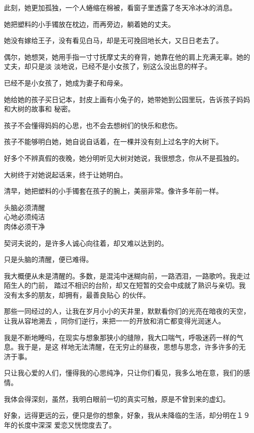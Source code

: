 \documentclass[12pt,a4paper]{article}
\begin{document}
		此刻，她更加孤独，一个人蜷缩在棉被，看窗子里透露了冬天冷冰冰的消息。

		她把塑料的小手镯放在枕边，而再旁边，躺着她的丈夫。

		她没有嫁给王子，没有看见白马，却是无可挽回地长大，又日日老去了。

		偶尔，她想哭，她用手指一寸寸抚摩丈夫的脊背，她靠在他的肩上充满无辜。她的丈夫，却只是淡
	淡地说，已经不是小女孩了，别这么没出息的样子。

		已经不是小女孩了，她成为妻子和母亲。

		她给她的孩子买日记本，封皮上画有小兔子的，她带她到公园里玩，告诉孩子妈妈和大树的故事和
	秘密。

		孩子不会懂得妈妈的心思，也不会去想树们的快乐和悲伤。

		孩子不能够明白她，她自说自话着，在一棵并没有刻上过名字的大树下。


		好多个不辨真假的夜晚，她分明听见大树对她说，我很想念，你从不是孤独的。

		大树终于对她说起话来，终于让她明白。


		清早，她把塑料的小手镯套在孩子的腕上，美丽非常。像许多年前一样。

	\endwriting



		\longpoem{}{}{}
		头脑必须清醒 \\
		心地必须纯洁 \\
		肉体必须干净
		\endlongpoem

		契诃夫说的，是许多人诚心向往着，却又难以达到的。\par
		只是头脑的清醒，便已难得。

		我大概便从未是清醒的。多数，是混沌中迷糊向前，一路洒泪，一路歌吟。我走过陌生人的门前，
	踏过不相识的台阶，却又在短暂的交会中成就了熟识与亲切。我没有太多的朋友，却拥有，最善良贴心
	的伙伴。

		那些一同经过的人，让我在岁月小小的天井里，默默看你们的光亮在暗夜的天空，让我从容地溯去
	，同你们逆行，来把一一的开放和消亡都变得光润迷人。

		我是不断地睡吗，在现实与想象那狭小的缝隙，我大口喘气，呼吸迷药一样的气息。我于是，是这
	样地无法清醒，在无穷止的昼夜，思想与思念，许多许多的无济于事。

		只让我心爱的人们，懂得我的心思纯净，只让你们看见，我多么地在意，我们的感情。

		我体会得深刻，虽然，我明白眼前一切的真实可触，原是不曾到来的虚幻。

		好象，远得更远的云，便只是你的想象，好象，我从未降临的生活，却分明在１９年的长度中深深
	爱恋又恍惚度去了。
\end{document}

